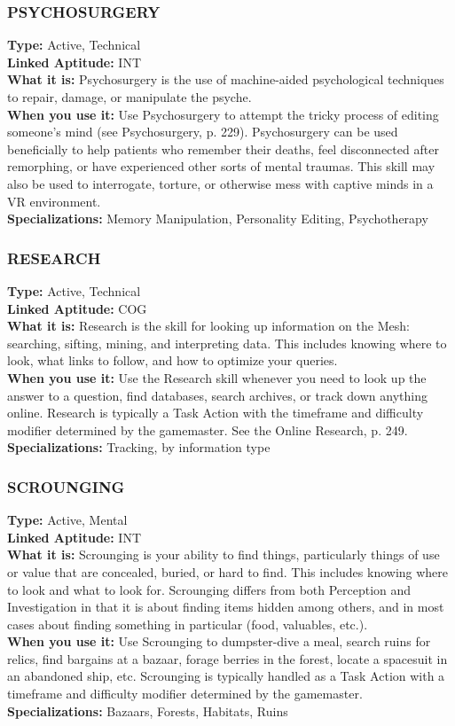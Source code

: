 \subsubsection{PSYCHOSURGERY} \textbf{Type:} Active, Technical \\ \textbf{Linked Aptitude:} INT \\ \textbf{What it is:} Psychosurgery is the use of machine-aided psychological techniques to repair, damage, or manipulate the psyche. \\ \textbf{When you use it:} Use Psychosurgery to attempt the tricky process of editing someone’s mind (see Psychosurgery, p. 229). Psychosurgery can be used beneficially to help patients who remember their deaths, feel disconnected after remorphing, or have experienced other sorts of mental traumas. This skill may also be used to interrogate, torture, or otherwise mess with captive minds in a VR environment. \\ \textbf{Specializations:} Memory Manipulation, Personality Editing, Psychotherapy 

\subsubsection{RESEARCH} \textbf{Type:} Active, Technical \\ \textbf{Linked Aptitude:} COG \\ \textbf{What it is:} Research is the skill for looking up information on the Mesh: searching, sifting, mining, and interpreting data. This includes knowing where to look, what links to follow, and how to optimize your queries. \\ \textbf{When you use it:} Use the Research skill whenever you need to look up the answer to a question, find databases, search archives, or track down anything online. Research is typically a Task Action with the timeframe and difficulty modifier determined by the gamemaster. See the Online Research, p. 249. \\ \textbf{Specializations:} Tracking, by information type 

\subsubsection{SCROUNGING} \textbf{Type:} Active, Mental \\ \textbf{Linked Aptitude:} INT \\ \textbf{What it is:} Scrounging is your ability to find things, particularly things of use or value that are concealed, buried, or hard to find. This includes knowing where to look and what to look for. Scrounging differs from both Perception and Investigation in that it is about finding items hidden among others, and in most cases about finding something in particular (food, valuables, etc.). \\ \textbf{When you use it:} Use Scrounging to dumpster-dive a meal, search ruins for relics, find bargains at a bazaar, forage berries in the forest, locate a spacesuit in an abandoned ship, etc. Scrounging is typically handled as a Task Action with a timeframe and difficulty modifier determined by the gamemaster. \\ \textbf{Specializations:} Bazaars, Forests, Habitats, Ruins 

